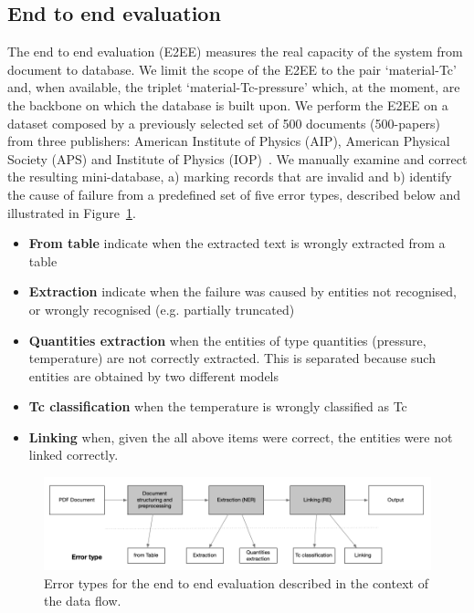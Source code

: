 \documentclass{article}
\begin{document}
\subsection{End to end evaluation}

The end to end evaluation (E2EE) measures the real capacity of the system from document to database.
We limit the scope of the E2EE to the pair `material-Tc' and, when available, the triplet `material-Tc-pressure' which, at the moment, are the backbone on which the database is built upon.
We perform the E2EE on a dataset composed by a previously selected set of 500 documents (500-papers) from three publishers: American Institute of Physics (AIP), American Physical Society (APS) and Institute of Physics (IOP)~\cite{foppiano2019proposal}.
We manually examine and correct the resulting mini-database, a) marking records that are invalid and b) identify the cause of failure from a predefined set of five error types, described below and illustrated in Figure~\ref{fig:error-types}. 
\begin{itemize}
    \item \textbf{From table} indicate when the extracted text is wrongly extracted from a table 
    \item \textbf{Extraction} indicate when the failure was caused by entities not recognised, or wrongly recognised (e.g. partially truncated)
    \item \textbf{Quantities extraction} when the entities of type quantities (pressure, temperature) are not correctly extracted. This is separated because such entities are obtained by two different models 
    \item \textbf{Tc classification} when the temperature is wrongly classified as Tc
    \item \textbf{Linking} when, given the all above items were correct, the entities were not linked correctly. 
\end{itemize}

\begin{figure}[ht]
\centering
\includegraphics[width=\textwidth]{error-types-2.png}
\caption{Error types for the end to end evaluation described in the context of the data flow. }
\label{fig:error-types}
\end{figure}
\end{document}
